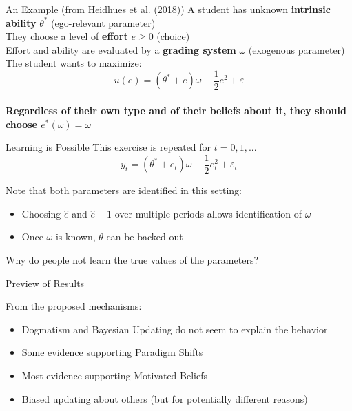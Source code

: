 \documentclass[aspectratio=169]{beamer}
\begin{document}
\begin{frame}{An Example (from Heidhues et al. (2018))}
    A student has unknown \textbf{intrinsic ability} $\theta^*$ (\alert{ego-relevant parameter})\\ 
    \bigskip
    They choose a level of \textbf{effort} $e\geq 0$ (\alert{choice}) \\
    \bigskip
    Effort and ability are evaluated by a \textbf{grading system} $\omega$ (\alert{exogenous parameter})\\
    \bigskip 
    The student wants to maximize:\\
        $$u(e) = (\theta^* + e)\omega-\frac{1}{2}e^2 +\varepsilon$$\\
    
    \bigskip
   \textbf{Regardless of their own type and of their beliefs about it, they should choose $e^*(\omega)=\omega$}\\

\end{frame}

\begin{frame}{Learning is Possible}
    This exercise is repeated for $t=0, 1, ...$
        $$y_t = (\theta^* + e_t)\omega-\frac{1}{2}e_t^2 +\varepsilon_t$$
    
    Note that both parameters are identified in this setting:\\
    \bigskip
    
    \begin{itemize}
        \item Choosing $\hat{e}$ and $\hat{e}+1$ over multiple periods allows identification of $\omega$\\
        \bigskip
        \item Once $\omega$ is known, $\theta$ can be backed out\\
     \end{itemize}
    \bigskip
    Why do people not learn the true values of the parameters?
\end{frame}

\begin{frame}{Preview of Results}

    From the proposed mechanisms:
    \begin{itemize}
        \item \alert{Dogmatism} and \alert{Bayesian Updating} do not seem to explain the behavior
        \bigskip
        \item Some evidence supporting \alert{Paradigm Shifts}
        \bigskip
        \item Most evidence supporting \alert{Motivated Beliefs}
        \bigskip
        \item Biased updating about others (but for potentially different reasons)
    \end{itemize}

\end{frame}
\end{document}

